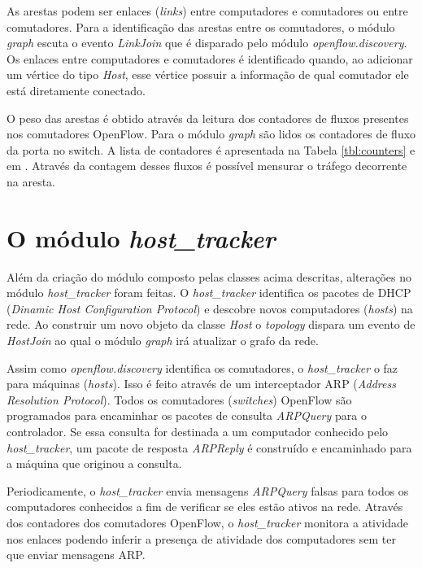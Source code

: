 As arestas podem ser enlaces (\emph{links}) entre computadores e comutadores ou
entre comutadores.
Para a identificação das arestas entre os comutadores, o módulo \emph{graph} 
escuta o evento \emph{LinkJoin} que é disparado pelo módulo 
\emph{openflow.discovery}.
Os enlaces entre computadores e comutadores é identificado quando, ao 
adicionar um vértice do tipo \emph{Host}, esse vértice possuir a informação
de qual comutador ele está diretamente conectado.

O peso das arestas é obtido através da leitura dos contadores de fluxos 
presentes nos comutadores OpenFlow.
Para o módulo \emph{graph} são lidos os contadores de fluxo da porta 
no switch. 
A lista de contadores é apresentada na Tabela \ref{tbl:counters} e em 
\citep{ofprotocol2015}.
Através da contagem desses fluxos é possível mensurar o tráfego 
decorrente na aresta.



\section{O módulo \emph{host\_tracker}}

Além da criação do módulo composto pelas classes acima descritas, alterações
no módulo \emph{host\_tracker} foram feitas.
O \emph{host\_tracker} identifica os pacotes de DHCP (\emph{Dinamic Host
Configuration Protocol}) e descobre novos computadores (\emph{hosts}) na rede.
Ao construir um novo objeto da classe \emph{Host} o \emph{topology} dispara
um evento de \emph{HostJoin} ao qual o módulo \emph{graph} irá atualizar
o grafo da rede.

Assim como \emph{openflow.discovery} identifica os comutadores, o 
\emph{host\_tracker} o faz para máquinas (\emph{hosts}).
Isso é feito através de um interceptador ARP (\emph{Address Resolution 
Protocol}).
Todos os comutadores (\emph{switches}) OpenFlow são programados para encaminhar
os pacotes de consulta \emph{ARPQuery} para o controlador.
Se essa consulta for destinada a um computador conhecido pelo
\emph{host\_tracker}, um pacote de resposta \emph{ARPReply} é construído e 
encaminhado para a máquina que originou a consulta.

Periodicamente, o \emph{host\_tracker} envia mensagens \emph{ARPQuery} falsas
para todos os computadores conhecidos a fim de verificar se eles estão ativos
na rede.
Através dos contadores dos comutadores OpenFlow, o \emph{host\_tracker} 
monitora a atividade nos enlaces podendo inferir a presença de atividade
dos computadores sem ter que enviar mensagens ARP.

